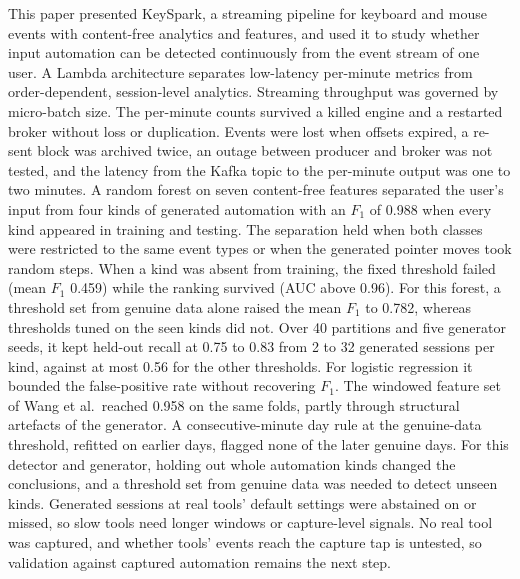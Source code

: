 \documentclass[sensors,article,submit,pdftex,oneauthor]{Definitions/mdpi}
\begin{document}
This paper presented KeySpark, a streaming pipeline for keyboard and mouse events with content-free analytics and features, and used it to study whether input automation can be detected continuously from the event stream of one user. A Lambda architecture separates low-latency per-minute metrics from order-dependent, session-level analytics. Streaming throughput was governed by micro-batch size. The per-minute counts survived a killed engine and a restarted broker without loss or duplication. Events were lost when offsets expired, a re-sent block was archived twice, an outage between producer and broker was not tested, and the latency from the Kafka topic to the per-minute output was one to two minutes. A random forest on seven content-free features separated the user's input from four kinds of generated automation with an $F_1$ of 0.988 when every kind appeared in training and testing. The separation held when both classes were restricted to the same event types or when the generated pointer moves took random steps. When a kind was absent from training, the fixed threshold failed (mean $F_1$ 0.459) while the ranking survived (AUC above 0.96). For this forest, a threshold set from genuine data alone raised the mean $F_1$ to 0.782, whereas thresholds tuned on the seen kinds did not. Over 40 partitions and five generator seeds, it kept held-out recall at 0.75 to 0.83 from 2 to 32 generated sessions per kind, against at most 0.56 for the other thresholds. For logistic regression it bounded the false-positive rate without recovering $F_1$. The windowed feature set of Wang et al.\ reached 0.958 on the same folds, partly through structural artefacts of the generator. A consecutive-minute day rule at the genuine-data threshold, refitted on earlier days, flagged none of the later genuine days. For this detector and generator, holding out whole automation kinds changed the conclusions, and a threshold set from genuine data was needed to detect unseen kinds. Generated sessions at real tools' default settings were abstained on or missed, so slow tools need longer windows or capture-level signals. No real tool was captured, and whether tools' events reach the capture tap is untested, so validation against captured automation remains the next step.

\vspace{6pt}

\end{document}
